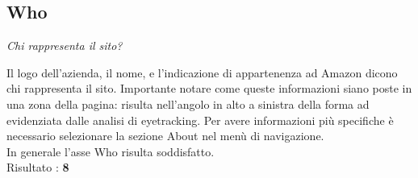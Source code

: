 \subsection{Who}
\begin{center}

\textit{Chi rappresenta il sito?}


\end{center}
\begin{flushleft}
Il logo dell'azienda, il nome, e l'indicazione di appartenenza ad Amazon 
dicono chi rappresenta il sito. Importante notare come queste 
informazioni siano poste in una zona  della pagina: risulta 
nell'angolo in alto a sinistra della forma ad  evidenziata 
dalle analisi di eyetracking. Per avere informazioni più specifiche
è necessario selezionare la sezione About nel menù di navigazione. \\
In generale l'asse Who risulta soddisfatto. \\
Risultato : \textbf{8}
\end{flushleft}
